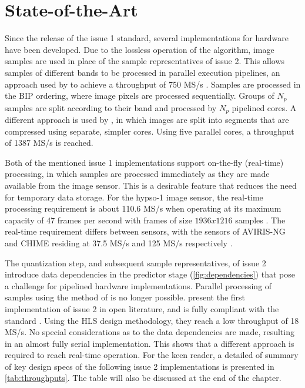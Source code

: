 \chapter{State-of-the-Art}
\label{sec:state-of-the-art}

Since the release of the issue 1 standard, several implementations for hardware have been developed. Due to the lossless operation of the algorithm, image samples are used in place of the sample representatives of issue 2. This allows samples of different bands to be processed in parallel execution pipelines, an approach used by \citeauthor{orlandicParallelFPGAImplementation2019} to achieve a throughput of 750 MS/s \cite{orlandicParallelFPGAImplementation2019}. Samples are processed in the \acrshort{BIP} ordering, where image pixels are processed sequentially. Groups of $N_p$ samples are split according to their band and processed by $N_p$ pipelined cores. A different approach is used by \citeauthor{tsigkanosHighPerformanceCOTSFPGA2020}, in which images are split into segments that are compressed using separate, simpler cores. Using five parallel cores, a throughput of 1387 MS/s is reached.

Both of the mentioned issue 1 implementations support on-the-fly (real-time) processing, in which samples are processed immediately as they are made available from the image sensor. This is a desirable feature that reduces the need for temporary data storage. For the \acrshort{hypso}-1 image sensor, the real-time processing requirement is about 110.6 MS/s when operating at its maximum capacity of 47 frames per second with frames of size $1936x1216$ samples \cite{grotteOceanColorHyperspectral2022}. The real-time requirement differs between sensors, with the sensors of AVIRIS-NG and CHIME residing at 37.5 MS/s and 125 MS/s respectively \cite{avirisng2021, barrios2020chime}.

The quantization step, and subsequent sample representatives, of issue 2 introduce data dependencies in the predictor stage (\autoref{fig:dependencies}) that pose a challenge for pipelined hardware implementations. Parallel processing of samples using the method of \citeauthor{orlandicParallelFPGAImplementation2019} is no longer possible. \citeauthor{barriosHardwareImplementationCCSDS2021} present the first implementation of issue 2 in open literature, and is fully compliant with the standard \cite{barriosHardwareImplementationCCSDS2021}. Using the \acrshort{HLS} design methodology, they reach a low throughput of 18 MS/s. No special considerations as to the data dependencies are made, resulting in an almost fully serial implementation. This shows that a different approach is required to reach real-time operation. For the keen reader, a detailed of summary of key design specs of the following issue 2 implementations is presented in \autoref{tab:throughputs}. The table will also be discussed at the end of the chapter.

